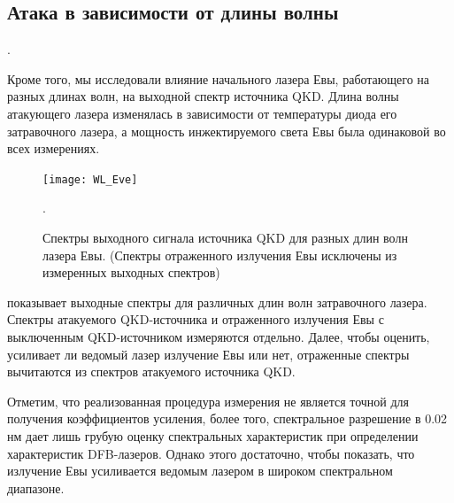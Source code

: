 \subsection{Атака в зависимости от длины волны}.

Кроме того, мы исследовали влияние начального лазера Евы, работающего на разных длинах волн, на выходной спектр источника QKD. Длина волны атакующего лазера изменялась в зависимости от температуры диода его затравочного лазера, а мощность инжектируемого света Евы была одинаковой во всех измерениях.

\begin{figure}
\texttt{[image: WL\_Eve]}
\caption{Спектры выходного сигнала источника QKD для разных длин волн лазера Евы. (Спектры отраженного излучения Евы исключены из измеренных выходных спектров)}.
\label{fig:WL_Eve}
\end{figure}

 показывает выходные спектры для различных длин волн затравочного лазера. Спектры атакуемого QKD-источника и отраженного излучения Евы с выключенным QKD-источником измеряются отдельно. Далее, чтобы оценить, усиливает ли ведомый лазер излучение Евы или нет, отраженные спектры вычитаются из спектров атакуемого источника QKD.

Отметим, что реализованная процедура измерения не является точной для получения коэффициентов усиления, более того, спектральное разрешение в 0.02 нм  дает лишь грубую оценку спектральных характеристик при определении характеристик DFB-лазеров. Однако этого достаточно, чтобы показать, что излучение Евы усиливается ведомым лазером в широком спектральном диапазоне.

\section{}